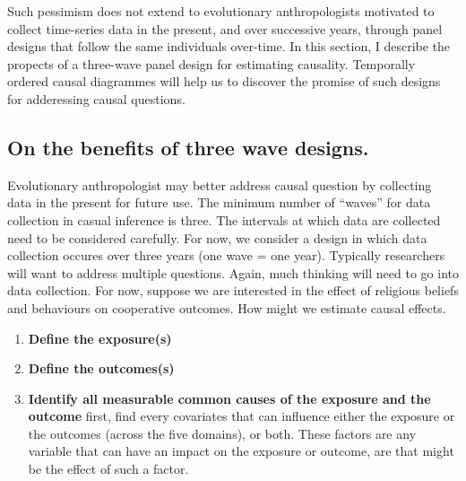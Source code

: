 \documentclass[
  singlecolumn]{report}
\begin{document}
Such pessimism does not extend to evolutionary anthropologists motivated
to collect time-series data in the present, and over successive years,
through panel designs that follow the same individuals over-time. In
this section, I describe the propects of a three-wave panel design for
estimating causality. Temporally ordered causal diagrammes will help us
to discover the promise of such designs for adderessing causal
questions.

\hypertarget{on-the-benefits-of-three-wave-designs.}{%
\subsection{On the benefits of three wave
designs.}\label{on-the-benefits-of-three-wave-designs.}}

Evolutionary anthropologist may better address causal question by
collecting data in the present for future use. The minimum number of
``waves'' for data collection in casual inference is three. The
intervals at which data are collected need to be considered carefully.
For now, we consider a design in which data collection occures over
three years (one wave = one year). Typically researchers will want to
address multiple questions. Again, much thinking will need to go into
data collection. For now, suppose we are interested in the effect of
religious beliefs and behaviours on cooperative outcomes. How might we
estimate causal effects.

\begin{enumerate}
\def\labelenumi{\arabic{enumi}.}
\item
  \textbf{Define the exposure(s)}
\item
  \textbf{Define the outcomes(s)}
\item
  \textbf{Identify all measurable common causes of the exposure and the
  outcome} first, find every covariates that can influence either the
  exposure or the outcomes (across the five domains), or both. These
  factors are any variable that can have an impact on the exposure or
  outcome, are that might be the effect of such a factor.
\end{enumerate}
\end{document}
